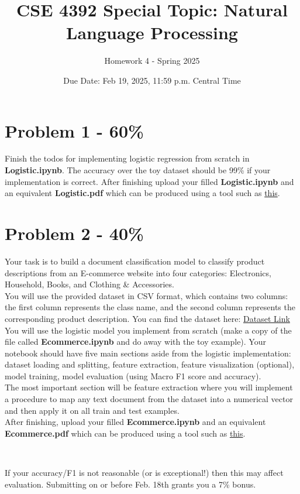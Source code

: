 \documentclass{article}
\begin{document}
\title{CSE 4392 Special Topic: Natural Language Processing}
\author{Homework 4 - Spring 2025}
\date{Due Date: Feb 19, 2025, 11:59 p.m. Central Time}
\maketitle
\thispagestyle{fancy}


\section*{Problem 1 - 60\%}
Finish the todos for implementing logistic regression from scratch in \textbf{Logistic.ipynb}. The accuracy over the toy dataset should be 99\% if your implementation is correct. After finishing upload your filled \textbf{Logistic.ipynb} and an equivalent \textbf{Logistic.pdf}  which can be produced using a tool such as \href{https://htmtopdf.herokuapp.com/ipynbviewer/}{this}.



\section*{Problem 2 - 40\%}
Your task is to build a document classification model to classify product descriptions from an E-commerce website into four categories: Electronics, Household, Books, and Clothing \& Accessories.  
\\[10pt]  
You will use the provided dataset in CSV format, which contains two columns: the first column represents the class name, and the second column represents the corresponding product description.  
You can find the dataset here: \href{https://drive.google.com/file/d/1YfG0iy0vpv7L0aqzDxvzHlW79HDdpZvg/view?usp=drive_link}{Dataset Link}
\\[10pt]  
You will use the logistic model you implement from scratch (make a copy of the file called \textbf{Ecommerce.ipynb} and do away with the toy example). Your notebook should have five main sections aside from the logistic implementation: dataset loading and splitting, feature extraction, feature visualization (optional), model training, model evaluation (using Macro F1 score and accuracy).
\\[10pt]  
The most important section will be feature extraction where you will implement a procedure to map any text document from the dataset into a numerical vector and then apply it on all train and test examples.
\\[10pt]  
After finishing, upload your filled \textbf{Ecommerce.ipynb} and an equivalent \textbf{Ecommerce.pdf} which can be produced using a tool such as \href{https://htmtopdf.herokuapp.com/ipynbviewer/}{this}.

\\[10pt]  
\begin{tcolorbox}[colback=blue!5, colframe=blue!75!black, title=Note]
If your accuracy/F1 is not reasonable (or is exceptional!) then this may affect evaluation. Submitting on or before Feb. 18th grants you a 7\% bonus.
\end{tcolorbox}
\end{document}
